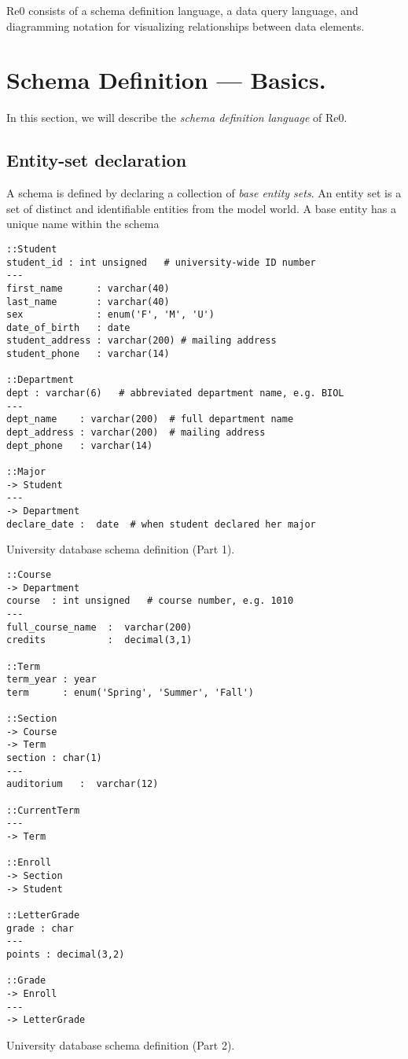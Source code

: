 \documentclass[letter,10pt]{article}
\begin{document}
Re0 consists of a schema definition language, a data query language, and diagramming notation for visualizing relationships between data elements. 

\section{Schema Definition --- Basics.}\label{sec:basic}
In this section, we will describe the \emph{schema definition language} of Re0.

\subsection{Entity-set declaration}
A schema is defined by declaring a collection of \emph{base entity sets}.
An entity set is a set of distinct and identifiable entities from the model world. 
A base entity has a unique name within the schema 

\begin{lstfloat*}
\begin{lstlisting}[language=dj]
::Student     
student_id : int unsigned   # university-wide ID number 
---
first_name      : varchar(40)
last_name       : varchar(40)
sex             : enum('F', 'M', 'U')
date_of_birth   : date
student_address : varchar(200) # mailing address
student_phone   : varchar(14) 

::Department 
dept : varchar(6)   # abbreviated department name, e.g. BIOL
---
dept_name    : varchar(200)  # full department name
dept_address : varchar(200)  # mailing address
dept_phone   : varchar(14)  

::Major
-> Student
---
-> Department
declare_date :  date  # when student declared her major  
\end{lstlisting}
\caption{University database schema definition (Part 1).}
\end{lstfloat*}

\begin{lstfloat*}
\begin{lstlisting}[language=dj]
::Course     
-> Department
course  : int unsigned   # course number, e.g. 1010
---
full_course_name  :  varchar(200)
credits           :  decimal(3,1)

::Term
term_year : year 
term      : enum('Spring', 'Summer', 'Fall')

::Section 
-> Course
-> Term 
section : char(1)
---
auditorium   :  varchar(12)

::CurrentTerm
---
-> Term

::Enroll
-> Section
-> Student 

::LetterGrade
grade : char
---
points : decimal(3,2)

::Grade 
-> Enroll
---
-> LetterGrade

\end{lstlisting}
\caption{University database schema definition (Part 2).}
\end{lstfloat*}
\end{document}
